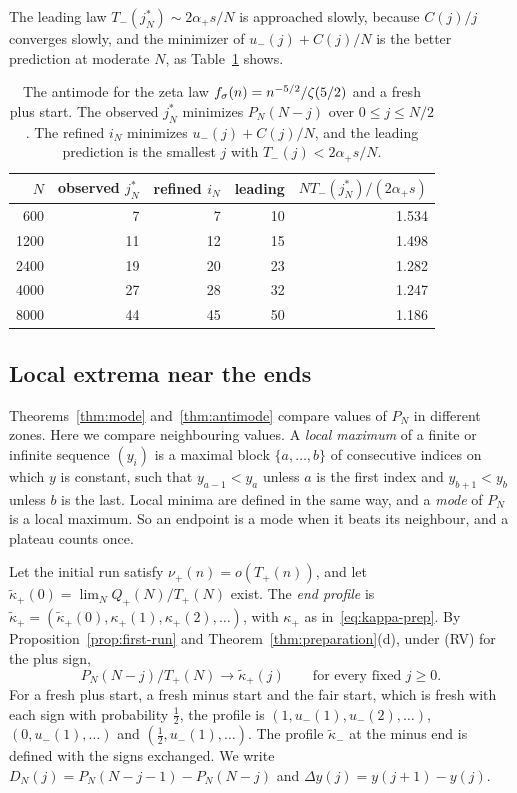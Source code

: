 The leading law $T_\minus(j^*_N)\sim2\alpha_\plus s/N$ is approached slowly,
because $C(j)/j$ converges slowly, and the minimizer of $u_\minus(j)+C(j)/N$ is the
better prediction at moderate $N$, as Table~\ref{tab:antimode} shows.

\begin{table}[ht]
\centering\small
\begin{tabular}{@{}rrrrr@{}}
\toprule
$N$ & observed $j^*_N$ & refined $i_N$ & leading & $NT_\minus(j^*_N)/(2\alpha_\plus s)$\\
\midrule
600 & 7 & 7 & 10 & 1.534\\
1200 & 11 & 12 & 15 & 1.498\\
2400 & 19 & 20 & 23 & 1.282\\
4000 & 27 & 28 & 32 & 1.247\\
8000 & 44 & 45 & 50 & 1.186\\
\bottomrule
\end{tabular}
\caption{The antimode for the zeta law $f_\sigma(n)=n^{-5/2}/\zeta(5/2)$ and a fresh
plus start. The observed $j^*_N$ minimizes $P_N(N-j)$ over $0\le j\le N/2$. The
refined $i_N$ minimizes $u_\minus(j)+C(j)/N$, and the leading prediction is the
smallest $j$ with $T_\minus(j)<2\alpha_\plus s/N$.}
\label{tab:antimode}
\end{table}

\subsection{Local extrema near the ends}\label{sec:extrema}

Theorems~\ref{thm:mode} and~\ref{thm:antimode} compare values of $P_N$ in different zones.
Here we compare neighbouring values. A \emph{local maximum} of a finite or infinite
sequence $(y_i)$ is a maximal block $\{a,\dots,b\}$ of consecutive indices on which $y$ is
constant, such that $y_{a-1}<y_a$ unless $a$ is the first index and $y_{b+1}<y_b$ unless
$b$ is the last. Local minima are defined in the same way, and a \emph{mode} of $P_N$ is a
local maximum. So an endpoint is a mode when it beats its neighbour, and a plateau counts
once.

Let the initial run satisfy $\nu_\plus(n)=o(T_\plus(n))$, and let
$\widetilde\kappa_\plus(0)=\lim_NQ_\plus(N)/T_\plus(N)$ exist. The \emph{end profile} is
$\widetilde\kappa_\plus=(\widetilde\kappa_\plus(0),\kappa_\plus(1),\kappa_\plus(2),\dots)$,
with $\kappa_\plus$ as in~\eqref{eq:kappa-prep}. By Proposition~\ref{prop:first-run} and
Theorem~\ref{thm:preparation}(d), under (RV) for the plus sign,
\begin{equation}\label{eq:profile-limit}
 P_N(N-j)/T_\plus(N)\to\widetilde\kappa_\plus(j)\qquad\text{for every fixed }j\ge0 .
\end{equation}
For a fresh plus start, a fresh minus start and the fair start, which is fresh with each
sign with probability $\frac12$, the profile is $(1,u_\minus(1),u_\minus(2),\dots)$,
$(0,u_\minus(1),\dots)$ and $(\frac12,u_\minus(1),\dots)$. The profile $\widetilde\kappa_\minus$
at the minus end is defined with the signs exchanged. We write
$D_N(j)=P_N(N-j-1)-P_N(N-j)$ and $\Delta y(j)=y(j+1)-y(j)$.

